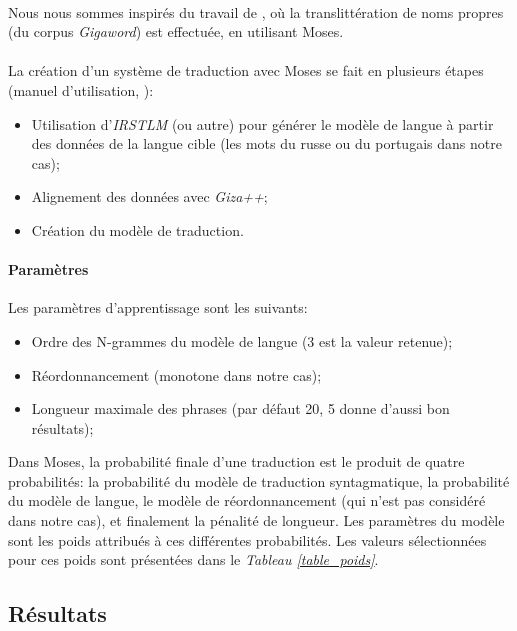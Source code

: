 \documentclass{article}
\begin{document}
\paragraph{}
Nous nous sommes inspirés du travail de \cite{Matthews}, où la translittération de noms propres (du corpus \emph{Gigaword}) est effectuée, en utilisant Moses.

\paragraph{}
La création d'un système de traduction avec Moses se fait en plusieurs étapes (manuel d'utilisation, \cite{Moses}):
\begin{itemize}
    \item Utilisation d'\emph{IRSTLM} (ou autre) pour générer le modèle de langue à partir des données de la langue cible (les mots du russe ou du portugais dans notre cas);
    \item Alignement des données avec \emph{Giza++};
    \item Création du modèle de traduction.
\end{itemize}

\paragraph{Paramètres}

Les paramètres d'apprentissage sont les suivants:
\begin{itemize}
    \item Ordre des N-grammes du modèle de langue (3 est la valeur retenue);
    \item Réordonnancement (monotone dans notre cas);
    \item Longueur maximale des phrases (par défaut 20, 5 donne d'aussi bon résultats);
\end{itemize}

Dans Moses, la probabilité finale d'une traduction est le produit de quatre probabilités: la probabilité du modèle de traduction syntagmatique, la probabilité du modèle de langue, le modèle de réordonnancement (qui n'est pas considéré dans notre cas), et finalement la pénalité de longueur. Les paramètres du modèle sont les poids attribués à ces différentes probabilités. Les valeurs sélectionnées pour ces poids sont présentées dans le \emph{Tableau \ref{table_poids}}.

\subsection{Résultats}
\end{document}
